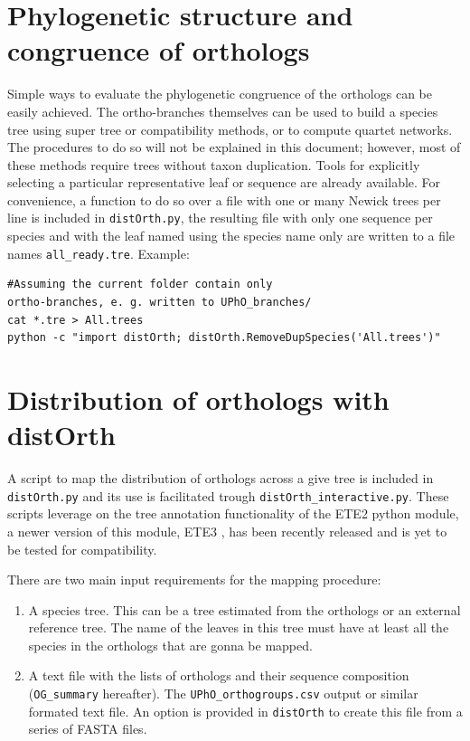 \documentclass[10pt]{article}
\begin{document}
\section{Phylogenetic structure and congruence of orthologs} Simple
ways to evaluate the phylogenetic congruence of the orthologs can be
easily achieved. The ortho-branches themselves can be used to build a
species tree using super tree or compatibility methods, or to compute quartet networks.
 The procedures to do so will not  be explained in this document; however,  most of these methods require trees
 without taxon duplication. Tools for explicitly selecting a
particular representative leaf or sequence are already available. For
convenience, a function to do so over a file with one or many Newick trees
per line is included in \texttt{distOrth.py}, the resulting file with
only one sequence per species and with the leaf named using the
species name only are written to a file names \texttt{all\_ready.tre}.
Example:

\begin{verbatim} 
#Assuming the current folder contain only
ortho-branches, e. g. written to UPhO_branches/ 
cat *.tre > All.trees
python -c "import distOrth; distOrth.RemoveDupSpecies('All.trees')"

\end{verbatim}

\section{Distribution of orthologs with distOrth} A script
to map the distribution of orthologs across a give tree is included in
\texttt{distOrth.py} and its use is facilitated trough
\texttt{distOrth\_interactive.py}. These scripts leverage on the tree
annotation functionality of the ETE2 python module, a newer version of this 
module, ETE3 \citep{Huerta-Cepas2016}, has been recently released and is yet to be tested for compatibility.

There are two main input requirements for the mapping procedure:
\begin{enumerate}
  \item A species tree. This can be a tree estimated from the
orthologs or an external reference tree. The name of the leaves in
this tree must have at least all the species in the orthologs that are
gonna be mapped.
  \item A text file with the lists of orthologs and their sequence composition (\texttt{OG\_summary} hereafter). The  \texttt{UPhO\_orthogroups.csv} output or similar formated text file. An option is provided in \texttt{distOrth}  to create this file from a series of FASTA files.
\end{enumerate} 
\end{document}
